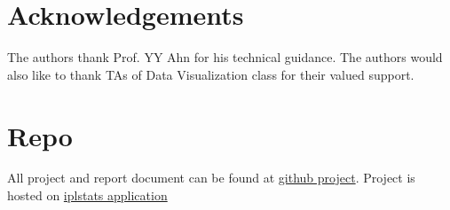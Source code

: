 \documentclass[sigconf]{acmart}
\begin{document}
\section{Acknowledgements}
 The authors thank Prof. YY Ahn for his technical guidance. The
 authors would also like to thank TAs of Data Visualization class for their valued
 support. 

\section{Repo} 
 All project and report document can be found at \href{https://github.com/abhishek8gupta/dviz-project-summer2018}{github project}.
 Project is hosted on \href{https://us-west-2b.online.tableau.com/#/site/summer2018dviz/views }{iplstats application}

\nocite{*}


\end{document}
